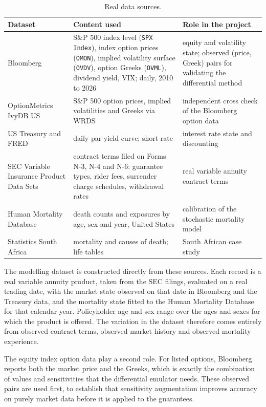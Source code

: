 \documentclass[12pt,a4paper]{article}
\begin{document}
\begin{table}[h]
\centering
\caption{Real data sources.}
\label{tab:data}
\small
\begin{tabular}{@{}p{3.6cm}p{4.4cm}p{5.6cm}@{}}
\toprule
\textbf{Dataset} & \textbf{Content used} & \textbf{Role in the project} \\
\midrule
Bloomberg \citep{bloomberg2026} & S\&P 500 index level (\texttt{SPX Index}), index option prices (\texttt{OMON}), implied volatility surface (\texttt{OVDV}), option Greeks (\texttt{OVML}), dividend yield, VIX; daily, 2010 to 2026 & equity and volatility state; observed (price, Greek) pairs for validating the differential method \\
OptionMetrics IvyDB US \citep{optionmetrics2026} & S\&P 500 option prices, implied volatilities and Greeks via WRDS & independent cross check of the Bloomberg option data \\
US Treasury \citep{ustreasury2026} and FRED \citep{fred2026} & daily par yield curve; short rate & interest rate state and discounting \\
SEC Variable Insurance Product Data Sets \citep{sec2025vip} & contract terms filed on Forms N-3, N-4 and N-6: guarantee types, rider fees, surrender charge schedules, withdrawal rates & real variable annuity contract terms \\
Human Mortality Database \citep{hmd2026} & death counts and exposures by age, sex and year, United States & calibration of the stochastic mortality model \\
Statistics South Africa \citep{statssa2024mortality} & mortality and causes of death; life tables & South African case study \\
\bottomrule
\end{tabular}
\end{table}

The modelling dataset is constructed directly from these sources. Each record is a real variable annuity product, taken from the SEC filings, evaluated on a real trading date, with the market state observed on that date in Bloomberg and the Treasury data, and the mortality state fitted to the Human Mortality Database for that calendar year. Policyholder age and sex range over the ages and sexes for which the product is offered. The variation in the dataset therefore comes entirely from observed contract terms, observed market history and observed mortality experience.

The equity index option data play a second role. For listed options, Bloomberg reports both the market price and the Greeks, which is exactly the combination of values and sensitivities that the differential emulator needs. These observed pairs are used first, to establish that sensitivity augmentation improves accuracy on purely market data before it is applied to the guarantees.
\end{document}
